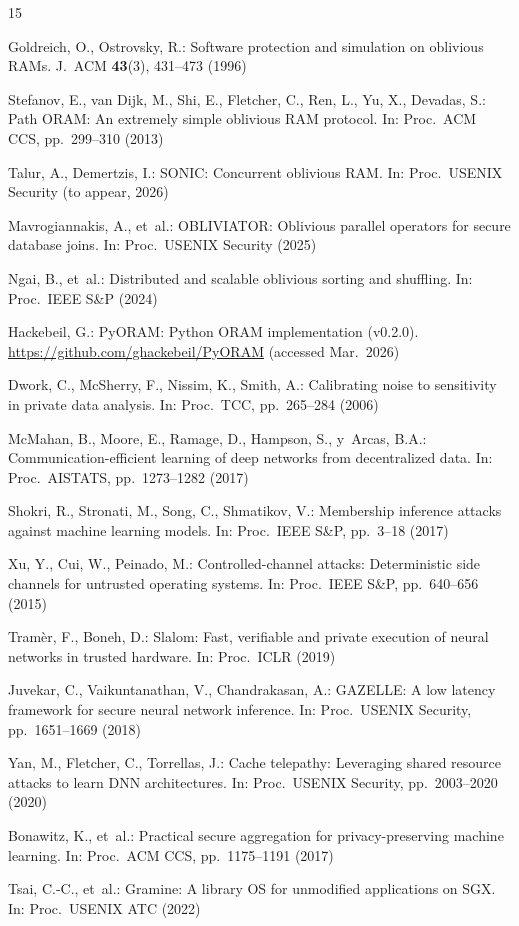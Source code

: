 \documentclass{llncs}
\begin{document}
\begin{thebibliography}{15}

Goldreich, O., Ostrovsky, R.:
Software protection and simulation on oblivious RAMs.
J.~ACM \textbf{43}(3), 431--473 (1996)

Stefanov, E., van Dijk, M., Shi, E., Fletcher, C., Ren, L., Yu, X., Devadas, S.:
Path ORAM: An extremely simple oblivious RAM protocol.
In: Proc.\ ACM CCS, pp.~299--310 (2013)

Talur, A., Demertzis, I.:
SONIC: Concurrent oblivious RAM.
In: Proc.\ USENIX Security (to appear, 2026)

Mavrogiannakis, A., et~al.:
OBLIVIATOR: Oblivious parallel operators for secure database joins.
In: Proc.\ USENIX Security (2025)

Ngai, B., et~al.:
Distributed and scalable oblivious sorting and shuffling.
In: Proc.\ IEEE S\&P (2024)

Hackebeil, G.:
PyORAM: Python ORAM implementation (v0.2.0).
\url{https://github.com/ghackebeil/PyORAM} (accessed Mar.\ 2026)

Dwork, C., McSherry, F., Nissim, K., Smith, A.:
Calibrating noise to sensitivity in private data analysis.
In: Proc.\ TCC, pp.~265--284 (2006)

McMahan, B., Moore, E., Ramage, D., Hampson, S., y~Arcas, B.A.:
Communication-efficient learning of deep networks from decentralized data.
In: Proc.\ AISTATS, pp.~1273--1282 (2017)

Shokri, R., Stronati, M., Song, C., Shmatikov, V.:
Membership inference attacks against machine learning models.
In: Proc.\ IEEE S\&P, pp.~3--18 (2017)

Xu, Y., Cui, W., Peinado, M.:
Controlled-channel attacks: Deterministic side channels for untrusted operating systems.
In: Proc.\ IEEE S\&P, pp.~640--656 (2015)

Tram\`{e}r, F., Boneh, D.:
Slalom: Fast, verifiable and private execution of neural networks in trusted hardware.
In: Proc.\ ICLR (2019)

Juvekar, C., Vaikuntanathan, V., Chandrakasan, A.:
GAZELLE: A low latency framework for secure neural network inference.
In: Proc.\ USENIX Security, pp.~1651--1669 (2018)

Yan, M., Fletcher, C., Torrellas, J.:
Cache telepathy: Leveraging shared resource attacks to learn DNN architectures.
In: Proc.\ USENIX Security, pp.~2003--2020 (2020)

Bonawitz, K., et~al.:
Practical secure aggregation for privacy-preserving machine learning.
In: Proc.\ ACM CCS, pp.~1175--1191 (2017)

Tsai, C.-C., et~al.:
Gramine: A library OS for unmodified applications on SGX.
In: Proc.\ USENIX ATC (2022)

\end{thebibliography}
\end{document}

